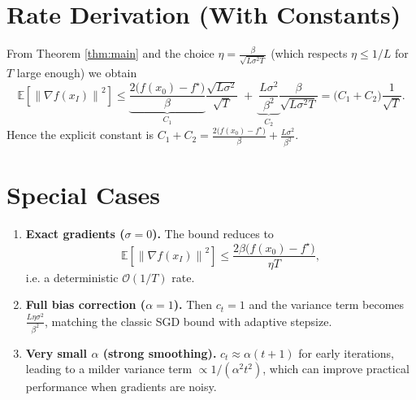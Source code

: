 \documentclass{article}
\newcommand{\E}{\mathbb{E}}
\newcommand{\norm}[1]{\left\lVert#1\right\rVert}
\begin{document}
\section*{Rate Derivation (With Constants)}
From Theorem \ref{thm:main} and the choice $\eta = \frac{\beta}{\sqrt{L\sigma^{2}T}}$ (which respects $\eta\le 1/L$ for $T$ large enough) we obtain
\[
\E\!\left[\norm{\nabla f(x_I)}^{2}\right]
\le
\underbrace{\frac{2\big(f(x_0)-f^\star\big)}{\beta}}_{C_1}
\frac{\sqrt{L\sigma^{2}}}{\sqrt{T}}
\;+\;
\underbrace{\frac{L\sigma^{2}}{\beta^{2}}}_{C_2}\frac{\beta}{\sqrt{L\sigma^{2}T}}
=
\big(C_1+C_2\big)\frac{1}{\sqrt{T}} .
\]
Hence the explicit constant is $C_1+C_2= \frac{2\big(f(x_0)-f^\star\big)}{\beta}+ \frac{L\sigma^{2}}{\beta^{2}}$.

\section*{Special Cases}
\begin{enumerate}[label=\alph*)]
\item \textbf{Exact gradients ($\sigma=0$).} The bound reduces to
\[
\E\!\left[\norm{\nabla f(x_I)}^{2}\right]\le\frac{2\beta\big(f(x_0)-f^\star\big)}{\eta T},
\]
i.e. a deterministic $\mathcal{O}(1/T)$ rate.
\item \textbf{Full bias correction ($\alpha=1$).} Then $c_t=1$ and the variance term becomes $\frac{L\eta\sigma^{2}}{\beta^{2}}$, matching the classic SGD bound with adaptive stepsize.
\item \textbf{Very small $\alpha$ (strong smoothing).} $c_t\approx \alpha(t+1)$ for early iterations, leading to a milder variance term $\propto 1/(\alpha^{2}t^{2})$, which can improve practical performance when gradients are noisy.
\end{enumerate}
\end{document}
